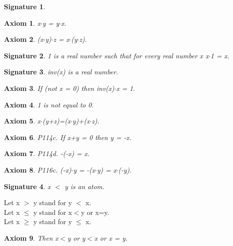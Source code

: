 \documentclass{article}
\newenvironment{forthel}{\begin{leftbar}}{\end{leftbar}}
\newtheorem{axiom}{Axiom}
\newtheorem{signature}{Signature}
\begin{document}
\begin{forthel}
\begin{signature}
\end{signature}
\begin{axiom} x$\cdot$y = y$\cdot$x.

\end{axiom}
\begin{axiom} (x$\cdot$y)$\cdot$z = x$\cdot$(y$\cdot$z).

\end{axiom}
\begin{signature} 1 is a real number such that for every real number x x$\cdot$1 = x.

\end{signature}
\begin{signature} inv(x) is a real number.

\end{signature}
\begin{axiom} If (not x = 0) then inv(x)$\cdot$x = 1.

\end{axiom}
\begin{axiom} 1 is not equal to 0.

\end{axiom}

\begin{axiom} x$\cdot$(y+z)=(x$\cdot$y)+(x$\cdot$z).

\end{axiom}


\begin{axiom} P114c. If x+y = 0 then y = -x.

\end{axiom}
\begin{axiom} P114d. -(-x) = x.

\end{axiom}

\begin{axiom} P116c. (-x)$\cdot$y = -(x$\cdot$y) = x$\cdot$(-y).

\end{axiom}




\begin{signature} x $<$ y is an atom.

\end{signature}
Let x $>$ y stand for y $<$ x.\\
Let x $\leq$ y stand for x$<$y or x=y.\\
Let x $\geq$ y stand for y $\leq$ x.\\

\begin{axiom} Then x$<$y or y$<$x or x = y.


\end{axiom}
\end{forthel}
\end{document}
